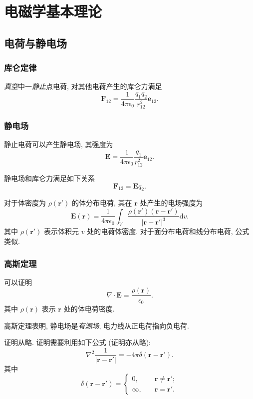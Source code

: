 \section{电磁学基本理论}
\subsection{电荷与静电场}
\subsubsection{库仑定律}
\textit{真空}中一\textit{静止}点电荷, 对其他电荷产生的库仑力满足
\begin{equation}
    \bm{F}_{12}=\frac{1}{4\pi\epsilon_0}\frac{q_1q_2}{r_{12}^2}\bm{e}_{12}.
\end{equation}

\subsubsection{静电场}
静止电荷可以产生静电场, 其强度为
\begin{equation}
    \bm{E}=\frac{1}{4\pi\epsilon_0}\frac{q_1}{r_{12}^2}\bm{e}_{12}.
\end{equation}

静电场和库仑力满足如下关系
\begin{equation}
    \bm{F}_{12}=\bm{E}q_2.
\end{equation}

对于体密度为 $\rho(\bm{r'})$ 的体分布电荷, 其在 $\bm{r}$ 处产生的电场强度为
\begin{equation} \label{eq:2.1 E v}
    \bm{E}(\bm{r})=\frac{1}{4\pi\epsilon_0}\int_V\frac{\rho(\bm{r'})(\bm{r}-\bm{r'})}{|\bm{r}-\bm{r'}|^3}\mathrm{d}v.
\end{equation}
其中 $\rho(\bm{r'})$ 表示体积元 $v$ 处的电荷体密度. 对于面分布电荷和线分布电荷, 公式类似.

\subsubsection{高斯定理}
可以证明
\begin{equation}
    \nabla\cdot\bm{E}=\frac{\rho(\bm{r})}{\epsilon_0}.
\end{equation}
其中 $\rho(\bm{r})$ 表示 $\bm{r}$ 处的体电荷密度.

高斯定理表明, 静电场是\textit{有源场}, 电力线从正电荷指向负电荷.

证明从略. 证明需要利用如下公式 (证明亦从略):
\begin{equation} \label{eq:2.1 nabla 2 r r'}
    \nabla^2\frac{1}{|\bm{r}-\bm{r'}|}=-4\pi\delta(\bm{r}-\bm{r'}).
\end{equation}
其中
\begin{equation}
    \delta(\bm{r}-\bm{r'})=\begin{cases}
        0,      & \quad \bm{r}\neq\bm{r'}; \\
        \infty, & \quad \bm{r}=\bm{r'}.
    \end{cases}
\end{equation}

